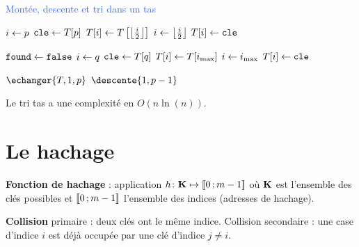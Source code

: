 \documentclass[a4paper,10pt,twocolumn]{article}
\begin{document}
	\begin{algorithm}[h]
	\caption{\textcolor{RoyalBlue}{Montée, descente et tri dans un tas}}

	{
		$i \leftarrow p$ \;
		$\texttt{cle} \leftarrow T[p]$ \;
		{
			$T[i] \leftarrow T \left[ \left\lfloor \frac{i}{2} \right\rfloor \right]$ \;
			$i \leftarrow \left\lfloor \frac{i}{2} \right\rfloor$ \;
		}
		$T[i] \leftarrow \texttt{cle}$ \;
	}

	{
		$\texttt{found} \leftarrow \texttt{false}$ \;
		$i \leftarrow q$ \;
		$\texttt{cle} \leftarrow T[q]$ \;
		{
			\Sinon
			{
			}
			{
				$T[i] \leftarrow T[i_{\max}]$ \;
				$i \leftarrow i_{\max}$ \;
			}
		}
		$T[i] \leftarrow \texttt{cle}$ \;
	}

	{
		{
			$\echanger{T,1,p}$ \;
			$\descente{1,p - 1}$ \;
		}
	}
	\end{algorithm}

	\begin{pop}
	Le tri tas a une complexité en $O(n\ln(n))$.
	\end{pop}


\section{Le hachage}

	\begin{defn}
	\textbf{Fonction de hachage} : application $h \colon \mathbf{K} \mapsto \mathopen{}\mathclose{\left[\![0\mathclose{}\mathpunct{};m - 1\right]\!]}$ où $\mathbf{K}$ est l'ensemble des clés possibles et $\mathopen{}\mathclose{\left[\![0\mathclose{}\mathpunct{};m - 1\right]\!]}$ l'ensemble des indices (adresses de hachage).
	\end{defn}

	\begin{defn}
	\textbf{Collision} primaire : deux clés ont le même indice.
	Collision secondaire : une case d'indice $i$ est déjà occupée par une clé d'indice $j \neq i$.
	\end{defn}
\end{document}
